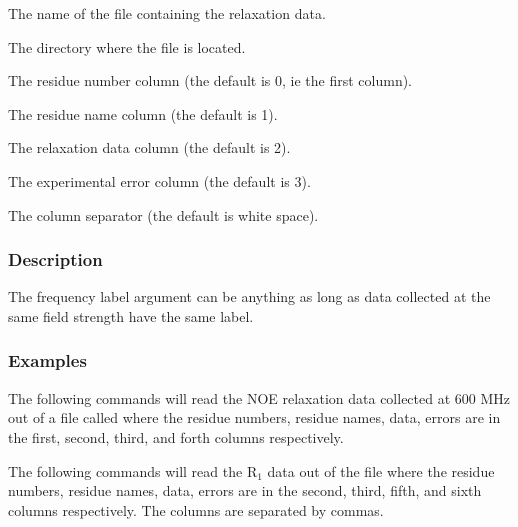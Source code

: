    The name of the file containing the relaxation data.   

   The directory where the file is located.   

   The residue number column (the default is 0, ie the first column).   

   The residue name column (the default is 1).   

   The relaxation data column (the default is 2).   

   The experimental error column (the default is 3).   

   The column separator (the default is white space).  

  

  
 \subsubsection{Description} 

 The frequency label argument can be anything as long as data collected at the same field strength have the same label. 
  

  
 \subsubsection{Examples} 

 The following commands will read the NOE relaxation data collected at 600 MHz out of a file called  where the residue numbers, residue names, data, errors are in the first, second, third, and forth columns respectively. 
  



 The following commands will read the R$_1$ data out of the file  where the residue numbers, residue names, data, errors are in the second, third, fifth, and sixth columns respectively.  The columns are separated by commas. 
  



